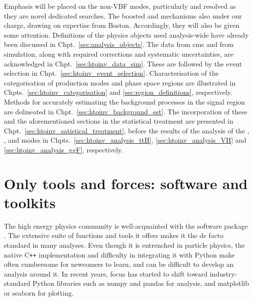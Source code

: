 Emphasis will be placed on the non-VBF modes, particularly \ttH and resolved \VH as they are novel dedicated searches. The boosted \VH and \ggH mechanisms also under our charge, drawing on expertise from Boston. Accordingly, they will also be given some attention. Definitions of the physics objects used analysis-wide have already been discussed in Chpt.~\ref{sec:analysis_objects}. The data from \acrshort{cms} and from simulation, along with required corrections and systematic uncertainties, are acknowledged in Chpt.~\ref{sec:htoinv_data_sim}. These are followed by the event selection in Chpt.~\ref{sec:htoinv_event_selection}. Characterisation of the categorisation of production modes and phase space regions are illustrated in Chpts.~\ref{sec:htoinv_categorisation} and \ref{sec:region_definitions}, respectively. Methods for accurately estimating the background processes in the signal region are delineated in Chpt.~\ref{sec:htoinv_background_est}. The incorporation of these and the aforementioned sections in the statistical treatment are presented in Chpt.~\ref{sec:htoinv_satistical_treatment}, before the results of the analysis of the \ttH, \VH, and \ggH modes in Chpts.~\ref{sec:htoinv_analysis_ttH}, \ref{sec:htoinv_analysis_VH} and \ref{sec:htoinv_analysis_ggF}, respectively.





\section{Only tools and forces: software and toolkits}
\label{sec:htoinv_software}

The high energy physics community is well-acquainted with the software package \ROOT. The extensive suite of functions and tools it offers makes it the de facto standard in many analyses. Even though it is entrenched in particle physics, the native C\texttt{++} implementation and difficulty in integrating it with Python make \ROOT often cumbersome for newcomers to learn, and can be difficult to develop an analysis around it. In recent years, focus has started to shift toward industry-standard Python libraries such as \textsf{numpy} and \textsf{pandas} for analysis, and \textsf{matplotlib} or \textsf{seaborn} for plotting.


